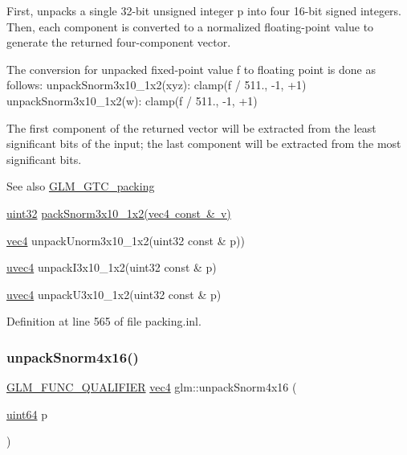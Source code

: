 First, unpacks a single 32-\/bit unsigned integer p into four 16-\/bit signed integers. Then, each component is converted to a normalized floating-\/point value to generate the returned four-\/component vector.

The conversion for unpacked fixed-\/point value f to floating point is done as follows\+: unpack\+Snorm3x10\+\_\+1x2(xyz)\+: clamp(f / 511., -\/1, +1) unpack\+Snorm3x10\+\_\+1x2(w)\+: clamp(f / 511., -\/1, +1)

The first component of the returned vector will be extracted from the least significant bits of the input; the last component will be extracted from the most significant bits.

\begin{DoxySeeAlso}{See also}
\mbox{\hyperlink{group__gtc__packing}{G\+L\+M\+\_\+\+G\+T\+C\+\_\+packing}} 

\mbox{\hyperlink{group__gtc__type__precision_ga202b6a53c105fcb7e531f9b443518451}{uint32}} \mbox{\hyperlink{group__gtc__packing_ga0d4157cec37c0312216a7be1cc92df54}{pack\+Snorm3x10\+\_\+1x2(vec4 const \& v)}} 

\mbox{\hyperlink{group__core__types_ga5881b1b022d7fd1b7218f5916532dd02}{vec4}} unpack\+Unorm3x10\+\_\+1x2(uint32 const \& p)) 

\mbox{\hyperlink{group__core__types_ga1c426d19627b32b14f0089f7f4ba7b1d}{uvec4}} unpack\+I3x10\+\_\+1x2(uint32 const \& p) 

\mbox{\hyperlink{group__core__types_ga1c426d19627b32b14f0089f7f4ba7b1d}{uvec4}} unpack\+U3x10\+\_\+1x2(uint32 const \& p) 
\end{DoxySeeAlso}


Definition at line 565 of file packing.\+inl.

\mbox{\label{group__gtc__packing_ga1bfaa3f217fd7a4b6b9d3117ecb3fcac}} 
\subsubsection{\texorpdfstring{unpackSnorm4x16()}{unpackSnorm4x16()}}
{\footnotesize\ttfamily \mbox{\hyperlink{setup_8hpp_a33fdea6f91c5f834105f7415e2a64407}{G\+L\+M\+\_\+\+F\+U\+N\+C\+\_\+\+Q\+U\+A\+L\+I\+F\+I\+ER}} \mbox{\hyperlink{group__core__types_ga5881b1b022d7fd1b7218f5916532dd02}{vec4}} glm\+::unpack\+Snorm4x16 (\begin{DoxyParamCaption}\item[{\mbox{\hyperlink{group__gtc__type__precision_gae3632bf9b37da66233d78930dd06378a}{uint64}}}]{p }\end{DoxyParamCaption})}


